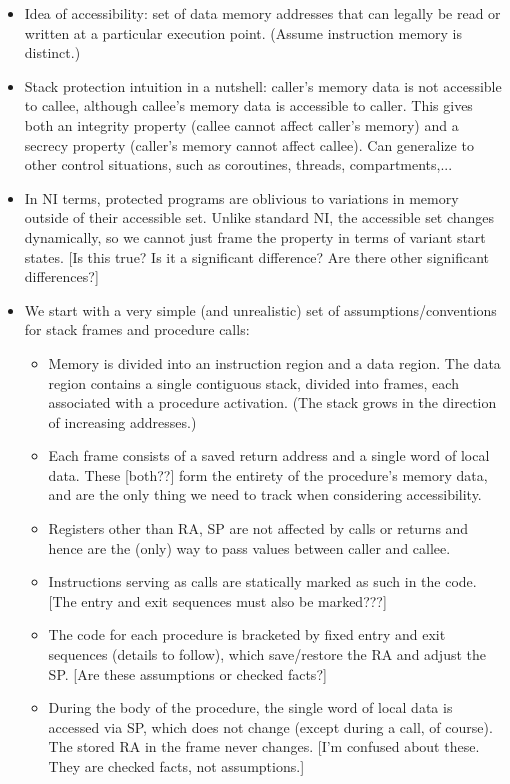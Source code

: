 \documentclass[conference]{IEEEtran}
\begin{document}
\begin{itemize}
\item
  Idea of accessibility: set of data memory addresses that can legally be read or written at a particular execution point.
  (Assume instruction memory is distinct.)
\item
  Stack protection intuition in a nutshell: caller's memory data is not accessible to callee, although callee's memory data is accessible to caller.
  This gives both an integrity property (callee cannot affect caller's memory) and a secrecy property
  (caller's memory cannot affect callee).
  Can generalize to other control situations, such as coroutines, threads, compartments,...
\item
  In NI terms, protected programs are oblivious to variations in memory outside of their accessible set.
  Unlike standard NI, the accessible set changes dynamically, so we cannot just frame the property in terms of
  variant start states. [Is this true? Is it a significant difference? Are there other significant differences?]
\item
  We start with a very simple (and unrealistic) set of assumptions/conventions for stack frames and procedure calls:
  \begin {itemize}
  \item Memory is divided into an instruction region and a data region. The data region contains a single contiguous stack, divided into frames, each associated with a procedure activation. (The stack grows in the direction of increasing addresses.)
  \item Each frame consists of a saved return address and a single word of local data. These [both??] form the entirety of the procedure's memory data, and are the only thing we need to track when considering accessibility.
  \item Registers other than RA, SP are not affected by calls or returns and hence are the (only) way to pass values between caller and callee.
  \item Instructions serving as calls are statically marked as such in the code. [The entry and exit sequences must also be marked???]
  \item The code for each procedure is bracketed by fixed entry and exit sequences (details to follow), which save/restore the RA and
    adjust the SP. [Are these assumptions or checked facts?]
  \item During the body of the procedure, the single word of local data is accessed via SP, which does not change (except during a call, of course).  The stored RA in the frame never changes. [I'm confused about these. They are checked facts, not assumptions.]

\end{itemize}
\end{itemize}
\end{document}
